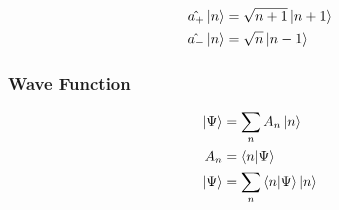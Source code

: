 \documentclass[10pt]{amsart}
\begin{document}
\begin{multicols}{2}
\begin{align*}
  \hat{a_{+}}\ket{n}&=\sqrt{n+1}\ket{n+1}\\
  \hat{a_{-}}\ket{n}&=\sqrt{n}\ket{n-1}
\end{align*}

\subsubsection{Wave Function}%
\label{ssub:wave_function}

\begin{align*}
  \ket{\Psi}&=\sum_nA_n\ket{n}\\
  A_n&=\braket{n}{\Psi}\\
  \ket{\Psi}&=\sum_n\braket{n}{\Psi}\ket{n}
\end{align*}
   
\end{multicols}
\end{document}
